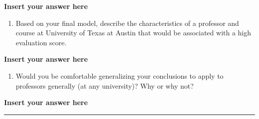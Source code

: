 \documentclass[
]{article}
\providecommand{\tightlist}{%
  \setlength{\itemsep}{0pt}\setlength{\parskip}{0pt}}
\begin{document}
\textbf{Insert your answer here}

\begin{enumerate}
\def\labelenumi{\arabic{enumi}.}
\setcounter{enumi}{17}
\tightlist
\item
  Based on your final model, describe the characteristics of a professor
  and course at University of Texas at Austin that would be associated
  with a high evaluation score.
\end{enumerate}

\textbf{Insert your answer here}

\begin{enumerate}
\def\labelenumi{\arabic{enumi}.}
\setcounter{enumi}{18}
\tightlist
\item
  Would you be comfortable generalizing your conclusions to apply to
  professors generally (at any university)? Why or why not?
\end{enumerate}

\textbf{Insert your answer here}

\begin{center}\rule{0.5\linewidth}{0.5pt}\end{center}
\end{document}
